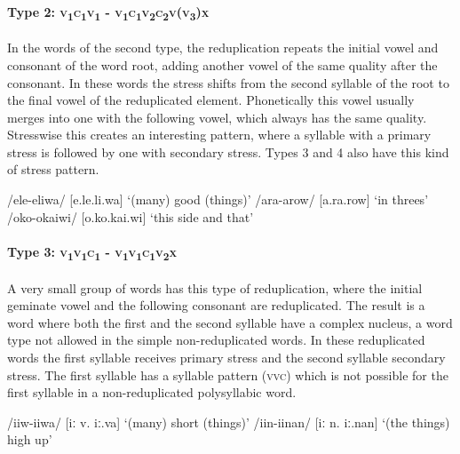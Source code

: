 \paragraph{Type 2:  \textsc{v}\textsubscript{1}\textsc{c}\textsubscript{1}\textsc{v}\textsubscript{1} - \textsc{v}\textsubscript{1}\textsc{c}\textsubscript{1}\textsc{v}\textsubscript{2}\textsc{c}\textsubscript{2}\textsc{v}(\textsc{v}\textsubscript{3})\textsc{x}}\label{sec:2:a:z:y:x}

In the words of the second type, the reduplication repeats the initial vowel and consonant of the word root, adding another vowel of the same quality after the consonant.  In these words the stress shifts from the second syllable of the root to the final vowel of the reduplicated element.  Phonetically this vowel usually merges into one with the following vowel, which always has the same quality.  Stresswise this creates an interesting pattern, where a syllable with a primary stress is followed by one with secondary stress.  Types 3 and 4 also have this kind of stress pattern.

\ea
\ea
/ele-eliwa/  [e.{{\textprimstress}}le.{{\textprimstress}}{{\textprimstress}}li.wa]  `(many) good (things)'
\ex
/ara-arow/  [a.{{\textprimstress}}ra.{{\textprimstress}}{{\textprimstress}}row]  `in threes'
\ex
/oko-okaiwi/  [o.{{\textprimstress}}ko.{{\textprimstress}}{{\textprimstress}}kai.wi]  `this side and that'
\z
\z

\paragraph{Type 3:  \textsc{v}\textsubscript{1}\textsc{v}\textsubscript{1}\textsc{c}\textsubscript{1} - \textsc{v}\textsubscript{1}\textsc{v}\textsubscript{1}\textsc{c}\textsubscript{1}\textsc{v}\textsubscript{2}\textsc{x}}\label{sec:2:a:z:y:x}

A very small group of words has this type of reduplication, where the initial geminate vowel and the following consonant are reduplicated.  The result is a word where both the first and the second syllable have a complex nucleus, a word type not allowed in the simple non-reduplicated words.  In these reduplicated words the first syllable receives primary stress and the second syllable secondary stress.  The first syllable has a syllable pattern (\textsc{vvc}) which is not possible for the first syllable in a non-reduplicated polysyllabic word.

\ea
\ea
/iiw-iiwa/  [{{\textprimstress}}iː v.{{\textprimstress}}{{\textprimstress}} iː.va]  `(many) short (things)'
\ex
/iin-iinan/  [{{\textprimstress}}iː n.{{\textprimstress}{{\textprimstress}} iː.nan}]  `(the things) high up'
\z
\z


